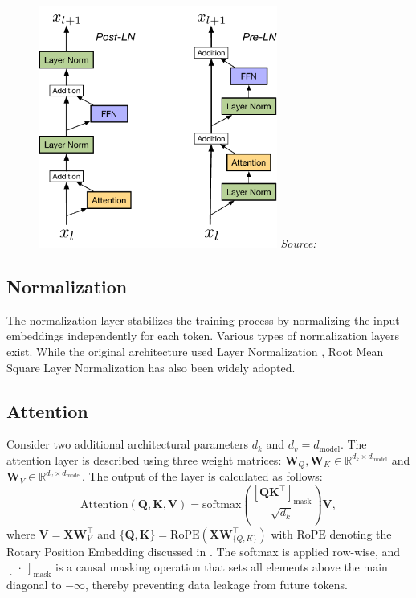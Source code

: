 \begin{figure}[ht]
    \centering
    \includegraphics[width=0.7\textwidth]{figures/post-vs-pre-norm.pdf}
    \label{fig:post-vs-pre-norm}
    \hfill\textit{Source: \citet{ding2021}}
\end{figure}

\subsection{Normalization}

The normalization layer stabilizes the training process by normalizing the input embeddings independently for each token. Various types of normalization layers exist. While the original architecture used Layer Normalization \parencite{ba2016}, Root Mean Square Layer Normalization \parencite{zhang2019} has also been widely adopted.

\subsection{Attention}

Consider two additional architectural parameters \(d_k\) and \(d_v = d_{\mathrm{model}}\). The attention layer is described using three weight matrices: \(\mathbf{W}_Q, \mathbf{W}_K \in \mathbb{R}^{d_k \times d_{\mathrm{model}}}\) and \(\mathbf{W}_V \in \mathbb{R}^{d_v \times d_{\mathrm{model}}}\). The output of the layer is calculated as follows:
\begin{equation}\label{eq:attention}
    \mathrm{Attention}(\mathbf{Q}, \mathbf{K}, \mathbf{V}) = \mathrm{softmax}\left(\frac{\left[\mathbf{QK}^\top\right]_{\mathrm{mask}}}{\sqrt{d_k}}\right)\mathbf{V},
\end{equation}
where \(\mathbf{V} = \mathbf{XW}_V^{\top}\) and \(\{\mathbf{Q}, \mathbf{K}\} = \mathrm{RoPE}(\mathbf{XW}_{\{Q, K\}}^\top)\) with \(\mathrm{RoPE}\) denoting the Rotary Position Embedding discussed in . The softmax is applied row-wise, and \([\ \cdot \ ]_{\mathrm{mask}}\) is a causal masking operation that sets all elements above the main diagonal to \(-\infty\), thereby preventing data leakage from future tokens.

